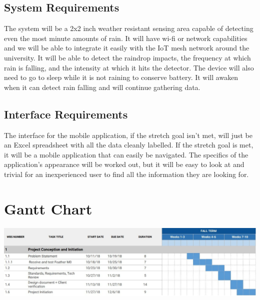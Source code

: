 \documentclass[letterpaper,10pt,draftclsnofoot,onecolumn]{article}
\begin{document}
\subsection{System Requirements}
The system will be a 2x2 inch weather resistant sensing area capable of detecting even the most minute amounts of rain. It will have wi-fi or network capabilities and we will be able to integrate it easily with the IoT mesh network around the university. It will be able to detect the raindrop impacts, the frequency at which rain is falling, and the intensity at which it hits the detector. The device will also need to go to sleep while it is not raining to conserve battery. It will awaken when it can detect rain falling and will continue gathering data.

\subsection{Interface Requirements}
The interface for the mobile application, if the stretch goal isn't met, will just be an Excel spreadsheet with all the data cleanly labelled. If the stretch goal is met, it will be a mobile application that can easily be navigated. The specifics of the application's appearance will be worked out, but it will be easy to look at and trivial for an inexperienced user to find all the information they are looking for.

\section{Gantt Chart}


\includegraphics[scale=0.55]{GanttChart.eps}
\newline




\end{document}
